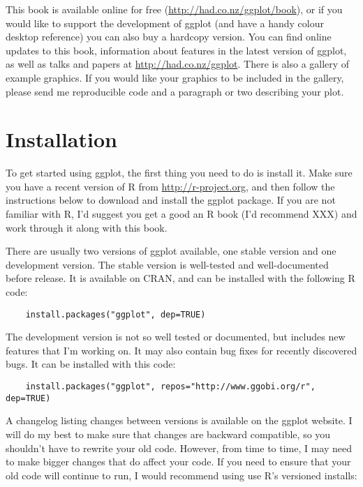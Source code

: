 This book is available online for free (\url{http://had.co.nz/ggplot/book}), or if you would like to support the development of ggplot (and have a handy colour desktop reference) you can also buy a hardcopy version.  You can find online updates to this book, information about features in the latest version of ggplot, as well as talks and papers at \url{http://had.co.nz/ggplot}.  There is also a gallery of example graphics.  If you would like your graphics to be included in the gallery, please send me reproducible code and a paragraph or two describing your plot.

\section{Installation}\label{sub:installation}

To get started using ggplot, the first thing you need to do is install it.  Make sure you have a recent version of R from \url{http://r-project.org}, and then follow the instructions below to download and install the ggplot package.  If you are not familiar with R, I'd suggest you get a good an R book (I'd recommend XXX) and work through it along with this book.

There are usually two versions of ggplot available, one stable version and one development version. The stable version is well-tested and well-documented before release.  It is available on CRAN, and can be installed with the following R code:

\begin{verbatim}
	install.packages("ggplot", dep=TRUE)
\end{verbatim}

The development version is not so well tested or documented, but includes new features that I'm working on.  It may also contain bug fixes for recently discovered bugs.  It can be installed with this code:

\begin{verbatim}
	install.packages("ggplot", repos="http://www.ggobi.org/r", dep=TRUE)
\end{verbatim}

A changelog listing changes between versions is available on the ggplot website.  I will do my best to make sure that changes are backward compatible, so you shouldn't have to rewrite your old code.  However, from time to time, I may need to make bigger changes that do affect your code.  If you need to ensure that your old code will continue to run, I would recommend using use R's versioned installs:

